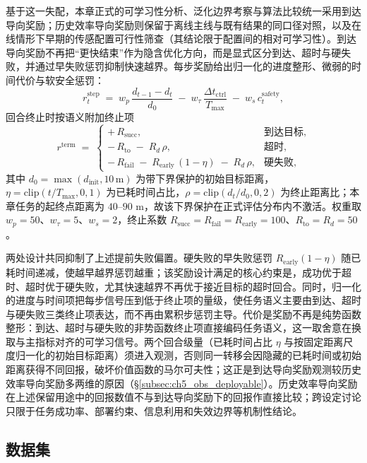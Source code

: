 基于这一失配，本章正式的可学习性分析、泛化边界考察与算法比较统一采用到达导向奖励；历史效率导向奖励则保留于离线主线与既有结果的同口径对照，以及在线情形下早期的传感配置可行性筛查（其结论限于配置间的相对可学习性）。到达导向奖励不再把“更快结束”作为隐含优化方向，而是显式区分到达、超时与硬失败，并通过早失败惩罚抑制快速越界。每步奖励给出归一化的进度整形、微弱的时间代价与软安全惩罚：
\begin{equation}
r_t^{\mathrm{step}} \;=\; w_p\,\frac{d_{t-1}-d_t}{d_0}
\;-\; w_\tau\,\frac{\Delta t_{\mathrm{ctrl}}}{T_{\max}}
\;-\; w_s\,c_t^{\mathrm{safety}},
\label{eq:ch5_reward_arrival_step}
\end{equation}
回合终止时按语义附加终止项
\begin{equation}
r^{\mathrm{term}} \;=\;
\begin{cases}
+\,R_{\mathrm{succ}}, & \text{到达目标},\\[2pt]
-\,R_{\mathrm{to}} \;-\; R_d\,\rho, & \text{超时},\\[2pt]
-\,R_{\mathrm{fail}} \;-\; R_{\mathrm{early}}\,(1-\eta) \;-\; R_d\,\rho, & \text{硬失败},
\end{cases}
\label{eq:ch5_reward_arrival_term}
\end{equation}
其中 $d_0=\max(d_{\mathrm{init}},10\,\mathrm{m})$ 为带下界保护的初始目标距离，$\eta=\mathrm{clip}(t/T_{\max},0,1)$ 为已耗时间占比，$\rho=\mathrm{clip}(d_t/d_0,0,2)$ 为终止距离比；本章任务的起终点距离为 $40$--$90$ m，故该下界保护在正式评估分布内不激活。权重取 $w_p=50$、$w_\tau=5$、$w_s=2$，终止系数 $R_{\mathrm{succ}}=R_{\mathrm{fail}}=R_{\mathrm{early}}=100$、$R_{\mathrm{to}}=R_d=50$。

两处设计共同抑制了上述提前失败偏置。硬失败的早失败惩罚 $R_{\mathrm{early}}(1-\eta)$ 随已耗时间递减，使越早越界惩罚越重；该奖励设计满足的核心约束是，成功优于超时、超时优于硬失败，尤其快速越界不再优于接近目标的超时回合。同时，归一化的进度与时间项把每步信号压到低于终止项的量级，使任务语义主要由到达、超时与硬失败三类终止项表达，而不再由累积步惩罚主导。代价是奖励不再是纯势函数整形：到达、超时与硬失败的非势函数终止项直接编码任务语义，这一取舍意在换取与主指标对齐的可学习信号。两个回合级量（已耗时间占比 $\eta$ 与按固定距离尺度归一化的初始目标距离）须进入观测，否则同一转移会因隐藏的已耗时间或初始距离获得不同回报，破坏价值函数的马尔可夫性；这正是到达导向奖励观测较历史效率导向奖励多两维的原因（\S\ref{subsec:ch5_obs_deployable}）。历史效率导向奖励在上述保留用途中的回报数值不与到达导向奖励下的回报作直接比较；跨设定讨论只限于任务成功率、部署约束、信息利用和失效边界等机制性结论。

\subsection{数据集}\label{subsec:ch5_datasets}

